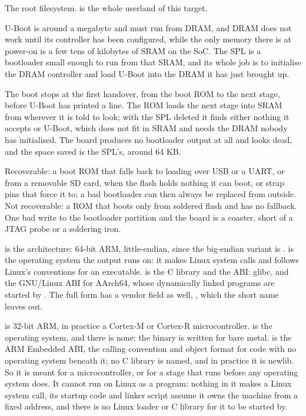  The root filesystem.  is the whole userland of this target.


 U-Boot is around a megabyte and must run from DRAM, and DRAM does not work until its
controller has been configured, while the only memory there is at power-on is a few tens of
kilobytes of SRAM on the SoC. The SPL is a bootloader small enough to run from that SRAM, and its
whole job is to initialise the DRAM controller and load U-Boot into the DRAM it has just brought up.

 The boot stops at the first handover, from the boot ROM to the next stage, before U-Boot
has printed a line. The ROM loads the next stage into SRAM from wherever it is told to look; with
the SPL deleted it finds either nothing it accepts or U-Boot, which does not fit in SRAM and needs
the DRAM nobody has initialised. The board produces no bootloader output at all and looks dead, and
the space saved is the SPL's, around 64 KB.

 Recoverable: a boot ROM that falls back to loading over USB or a UART, or from a removable
SD card, when the flash holds nothing it can boot, or strap pins that force it to; a bad bootloader
can then always be replaced from outside. Not recoverable: a ROM that boots only from soldered flash
and has no fallback. One bad write to the bootloader partition and the board is a coaster, short of
a JTAG probe or a soldering iron.


  is the architecture: 64-bit ARM, little-endian, since the big-endian
variant is .  is the operating system the output runs on: it makes
Linux system calls and follows Linux's conventions for an executable.  is the C library
and the ABI: glibc, and the GNU/Linux ABI for AArch64, whose dynamically linked programs are started
by . The full form has a vendor field as well,
, which the short name leaves out.

  is 32-bit ARM, in practice a Cortex-M or Cortex-R microcontroller. 
is the operating system, and there is none: the binary is written for bare metal.  is the
ARM Embedded ABI, the calling convention and object format for code with no operating system beneath
it; no C library is named, and in practice it is newlib. So it is meant for a microcontroller, or
for a stage that runs before any operating system does. It cannot run on Linux as a program: nothing
in it makes a Linux system call, its startup code and linker script assume it owns the machine from
a fixed address, and there is no Linux loader or C library for it to be started by.

